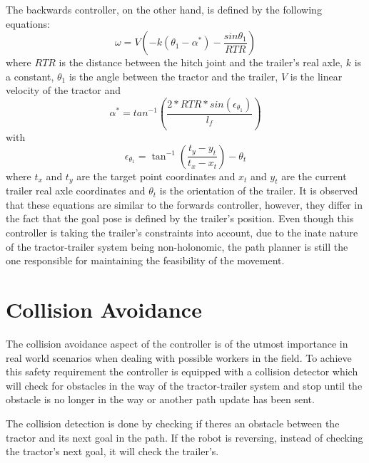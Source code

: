 The backwards controller, on the other hand, is defined by the following equations:
\begin{equation}
    \omega = V \left(-k (\theta_1 - \alpha^*) - \frac{sin\theta_1}{RTR}\right)
\end{equation}
where $RTR$ is the distance between the hitch joint and the trailer's real axle, 
$k$ is a constant, $\theta_1$ is the angle between the tractor and the trailer, 
$V$ is the linear velocity of the tractor and 
\begin{equation}
    \alpha^* = tan^{-1}\left(\frac{2*RTR*sin(\epsilon_{\theta_1})}{l_f}\right)
\end{equation}
with
\begin{equation}
    \epsilon_{\theta_1} = \tan^{-1}\left(\frac{t_y - y_t}{t_x - x_t}\right) - \theta_t
\end{equation}
where $t_x$ and $t_y$ are the target point coordinates and $x_t$ and $y_t$ are the current trailer real axle coordinates and 
$\theta_t$ is the orientation of the trailer. It is observed that 
these equations are similar to the forwards controller, however, they differ 
in the fact that the goal pose is defined by the trailer's position. Even though 
this controller is taking the trailer's constraints into account, due to 
the inate nature of the tractor-trailer system being non-holonomic, the 
path planner is still the one responsible for maintaining the feasibility 
of the movement.


\section{Collision Avoidance}
\label{sec:collision}
The collision avoidance aspect of the controller is of the utmost importance 
in real world scenarios when dealing with possible workers in the field. To achieve 
this safety requirement the controller is equipped with a collision detector 
which will check for obstacles in the way of the tractor-trailer system and stop until the 
obstacle is no longer in the way or another path update has been sent.

The collision detection is done by checking if theres an obstacle between the 
tractor and its next goal in the path. If the robot is reversing, instead 
of checking the tractor's next goal, it will check the trailer's.
